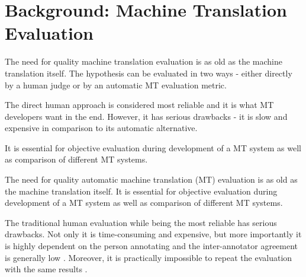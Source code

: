 \chapter{Background: Machine Translation Evaluation}

The need for quality machine translation evaluation is as old as the machine 
translation itself. The hypothesis can be evaluated in two ways - either 
directly by a human judge or by an automatic MT evaluation metric.

The direct human approach is considered most reliable and it is what MT 
developers want in the end. However, it has serious drawbacks - it is slow
and expensive in comparison to its automatic alternative.

It is essential for objective evaluation during development 
of a MT system as well as comparison of different MT systems.




The need for quality automatic machine translation (MT) evaluation is as old as
the machine translation itself. It is essential for objective evaluation during
development of a MT system as well as comparison of different MT systems.

The traditional human evaluation while being the most reliable has serious 
drawbacks. Not only it is time-consuming and expensive, but more importantly
it is highly dependent on the person annotating and the inter-annotator 
agreement is generally low  \cite{wmt13}. Moreover, it is practically 
impossible to repeat the evaluation with the same results \cite{bojar-kniha}.

